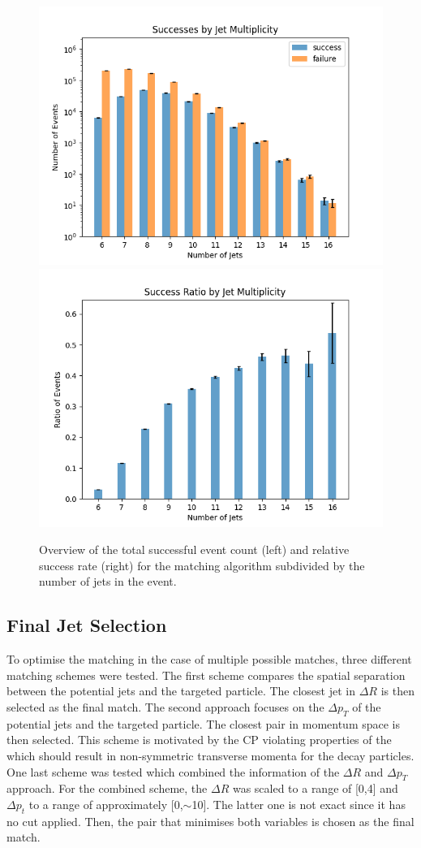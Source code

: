 \documentclass[bachelor,ngerman,english]{GAUBM}
\begin{document}
\begin{figure}
    \centering
    \includegraphics[width=.46\textwidth]{figures/truth_matching/success_by_jets.png}\hspace{.06\textwidth}
    \includegraphics[width=.46\textwidth]{figures/truth_matching/success_ratio.png}
    \caption{Overview of the total successful event count (left) and relative success rate (right) for the matching algorithm subdivided by the number of jets in the event.}
    \label{fig:success_by_jets}
\end{figure}

\subsection{Final Jet Selection}
\label{sec:status:final_jet_selection}
To optimise the matching in the case of multiple possible matches, three different matching schemes were tested. The first scheme compares the spatial separation between the potential jets and the targeted particle. The closest jet in $\Delta R$ is then selected as the final match. The second approach focuses on the $\Delta p_T$ of the potential jets and the targeted particle. The closest pair in momentum space is then selected. This scheme is motivated by the CP violating properties of the \wboson which should result in non-symmetric transverse momenta for the decay particles. One last scheme was tested which combined the information of the $\Delta R$ and $\Delta p_T$ approach. For the combined scheme, the $\Delta R$ was scaled to a range of [0,4] and $\Delta p_t$ to a range of approximately [0,$\sim$10]. The latter one is not exact since it has no cut applied. Then, the pair that minimises both variables is chosen as the final match.
\end{document}
